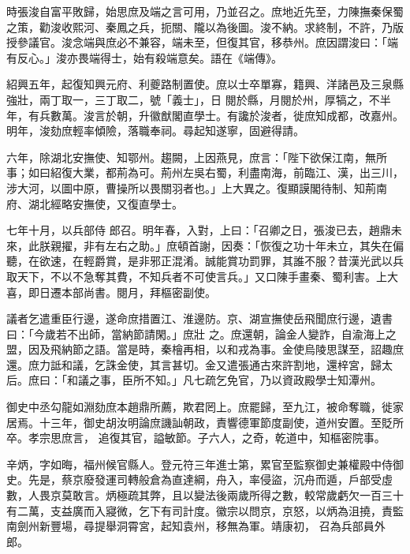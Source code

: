 \begin{pinyinscope}
 時張浚自富平敗歸，始思庶及端之言可用，乃並召之。庶地近先至，力陳撫秦保蜀之策，勸浚收熙河、秦鳳之兵，扼關、隴以為後圖。浚不納。求終制，不許，乃版授參議官。浚念端與庶必不兼容，端未至，但復其官，移恭州。庶因謂浚曰：「端有反心。」浚亦畏端得士，始有殺端意矣。語在《端傳》。



 紹興五年，起復知興元府、利夔路制置使。庶以士卒單寡，籍興、洋諸邑及三泉縣強壯，兩丁取一，三丁取二，號「義士」，日
 閱於縣，月閱於州，厚犒之，不半年，有兵數萬。浚言於朝，升徽猷閣直學士。有讒於浚者，徙庶知成都，改嘉州。明年，浚劾庶輕率傾險，落職奉祠。尋起知遂寧，固避得請。



 六年，除湖北安撫使、知鄂州。趨闕，上因燕見，庶言：「陛下欲保江南，無所事；如曰紹復大業，都荊為可。荊州左吳右蜀，利盡南海，前臨江、漢，出三川，涉大河，以圖中原，曹操所以畏關羽者也。」上大異之。復顯謨閣待制、知荊南府、湖北經略安撫使，又復直學士。



 七年十月，以兵部侍
 郎召。明年春，入對，上曰：「召卿之日，張浚已去，趙鼎未來，此朕親擢，非有左右之助。」庶頓首謝，因奏：「恢復之功十年未立，其失在偏聽，在欲速，在輕爵賞，是非邪正混淆。誠能賞功罰罪，其誰不服？昔漢光武以兵取天下，不以不急奪其費，不知兵者不可使言兵。」又口陳手畫秦、蜀利害。上大喜，即日遷本部尚書。閱月，拜樞密副使。



 議者乞遣重臣行邊，遂命庶措置江、淮邊防。京、湖宣撫使岳飛聞庶行邊，遺書曰：「今歲若不出師，當納節請閑。」庶壯
 之。庶還朝，論金人變詐，自渝海上之盟，因及飛納節之語。當是時，秦檜再相，以和戎為事。金使烏陵思謀至，詔趣庶還。庶力詆和議，乞誅金使，其言甚切。金又遣張通古來許割地，還梓宮，歸太后。庶曰：「和議之事，臣所不知。」凡七疏乞免官，乃以資政殿學士知潭州。



 御史中丞勾龍如淵劾庶本趙鼎所薦，欺君罔上。庶罷歸，至九江，被命奪職，徙家居焉。十三年，御史胡汝明論庶譏訕朝政，責響德軍節度副使，道州安置。至貶所卒。孝宗思庶言，
 追復其官，謚敏節。子六人，之奇，乾道中，知樞密院事。



 辛炳，字如晦，福州候官縣人。登元符三年進士第，累官至監察御史兼權殿中侍御史。先是，蔡京廢發運司轉般倉為直達綱，舟入，率侵盜，沉舟而遁，戶部受虛數，人畏京莫敢言。炳極疏其弊，且以變法後兩歲所得之數，較常歲虧欠一百三十有二萬，支益廣而入寢微，乞下有司計度。徽宗以問京，京怒，以炳為沮撓，責監南劍州新豐場，尋提舉洞霄宮，起知袁州，移無為軍。靖康初，
 召為兵部員外郎。




\end{pinyinscope}
